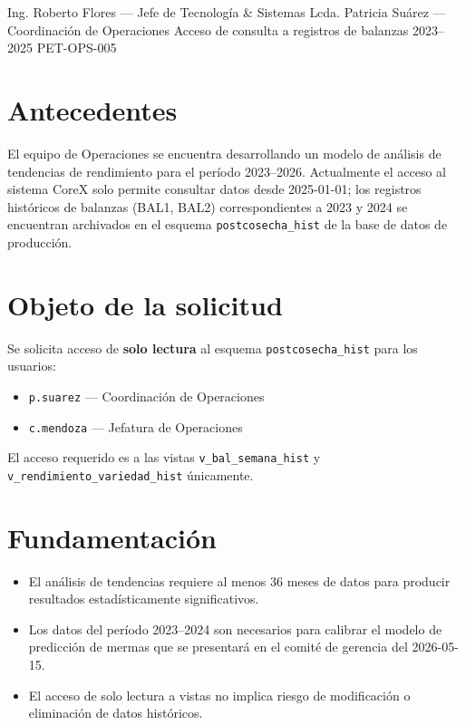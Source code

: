 \documentclass{../base/canon}
\begin{document}
\MemoBlock%
  {Ing. Roberto Flores — Jefe de Tecnología \& Sistemas}%
  {Lcda. Patricia Suárez — Coordinación de Operaciones}%
  {Acceso de consulta a registros de balanzas 2023--2025}%
  {PET-OPS-005}

\section{Antecedentes}

El equipo de Operaciones se encuentra desarrollando un modelo de análisis de
tendencias de rendimiento para el período 2023--2026.  Actualmente el acceso
al sistema CoreX solo permite consultar datos desde 2025-01-01; los registros
históricos de balanzas (BAL1, BAL2) correspondientes a 2023 y 2024 se encuentran
archivados en el esquema \texttt{postcosecha\_hist} de la base de datos de producción.

\section{Objeto de la solicitud}

Se solicita acceso de \textbf{solo lectura} al esquema \texttt{postcosecha\_hist}
para los usuarios:

\begin{itemize}
  \item \texttt{p.suarez} — Coordinación de Operaciones
  \item \texttt{c.mendoza} — Jefatura de Operaciones
\end{itemize}

El acceso requerido es a las vistas \texttt{v\_bal\_semana\_hist} y
\texttt{v\_rendimiento\_variedad\_hist} únicamente.

\section{Fundamentación}

\begin{itemize}
  \item El análisis de tendencias requiere al menos 36 meses de datos para
        producir resultados estadísticamente significativos.
  \item Los datos del período 2023--2024 son necesarios para calibrar el modelo
        de predicción de mermas que se presentará en el comité de gerencia del
        2026-05-15.
  \item El acceso de solo lectura a vistas no implica riesgo de modificación o
        eliminación de datos históricos.
\end{itemize}
\end{document}
